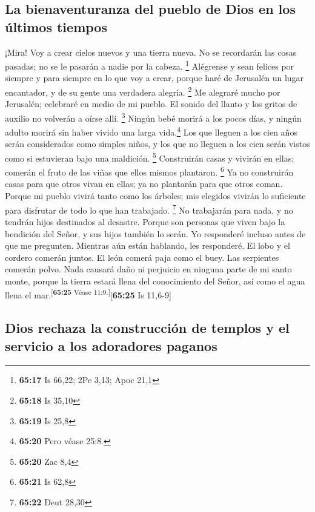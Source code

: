 \hypertarget{la-bienaventuranza-del-pueblo-de-dios-en-los-uxfaltimos-tiempos}{%
\subsection{La bienaventuranza del pueblo de Dios en los últimos
tiempos}\label{la-bienaventuranza-del-pueblo-de-dios-en-los-uxfaltimos-tiempos}}

 ¡Mira! Voy a crear cielos nuevos y una tierra nueva. No
se recordarán las cosas pasadas; no se le pasarán a nadie por la cabeza.
\footnote{\textbf{65:17} Is 66,22; 2Pe 3,13; Apoc 21,1} 
Alégrense y sean felices por siempre y para siempre en lo que voy a
crear, porque haré de Jerusalén un lugar encantador, y de su gente una
verdadera alegría. \footnote{\textbf{65:18} Is 35,10}  Me
alegraré mucho por Jerusalén; celebraré en medio de mi pueblo. El sonido
del llanto y los gritos de auxilio no volverán a oírse allí. \footnote{\textbf{65:19}
  Is 25,8}  Ningún bebé morirá a los pocos días, y ningún
adulto morirá sin haber vivido una larga vida.\footnote{\textbf{65:20}
  Pero véase 25:8.} Los que lleguen a los cien años serán considerados
como simples niños, y los que no lleguen a los cien serán vistos como si
estuvieran bajo una maldición. \footnote{\textbf{65:20} Zac 8,4}
 Construirán casas y vivirán en ellas; comerán el fruto
de las viñas que ellos mismos plantaron. \footnote{\textbf{65:21} Is
  62,8}  Ya no construirán casas para que otros vivan en
ellas; ya no plantarán para que otros coman. Porque mi pueblo vivirá
tanto como los árboles; mis elegidos vivirán lo suficiente para
disfrutar de todo lo que han trabajado. \footnote{\textbf{65:22} Deut
  28,30}  No trabajarán para nada, y no tendrán hijos
destinados al desastre. Porque son personas que viven bajo la bendición
del Señor, y sus hijos también lo serán.  Yo responderé
incluso antes de que me pregunten. Mientras aún están hablando, les
responderé.  El lobo y el cordero comerán juntos. El león
comerá paja como el buey. Las serpientes comerán polvo. Nada causará
daño ni perjuicio en ninguna parte de mi santo monte, porque la tierra
estará llena del conocimiento del Señor, así como el agua llena el
mar.\textsuperscript{{[}\textbf{65:25} Véase 11:9.{]}}{[}\textbf{65:25}
Is 11,6-9{]}

\hypertarget{dios-rechaza-la-construcciuxf3n-de-templos-y-el-servicio-a-los-adoradores-paganos}{%
\subsection{Dios rechaza la construcción de templos y el servicio a los
adoradores
paganos}\label{dios-rechaza-la-construcciuxf3n-de-templos-y-el-servicio-a-los-adoradores-paganos}}

